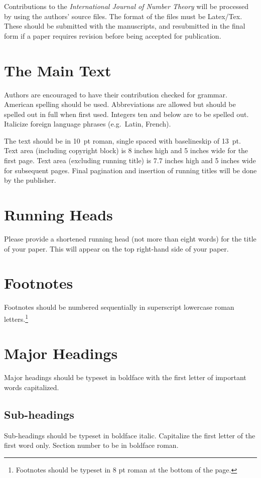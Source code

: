 \documentclass{ws-ijnt}
\begin{document}
Contributions to the {\it International Journal of Number Theory} 
will be processed by using the authors' source files. The format of 
the files must be Latex/Tex.  These should be submitted with the 
manuscripts, and resubmitted in the final form if a paper requires 
revision before being accepted for publication.

\section{The Main Text}

Authors are encouraged to have their contribution checked for grammar. 
American spelling should be used. Abbreviations are allowed but should
be spelled out in full when first used. Integers ten and below are to be
spelled out. Italicize foreign language phrases (e.g.~Latin, French).

The text should be in 10~pt roman, single spaced with  
baselineskip of 13~pt. Text area (including copyright block) 
is 8 inches high and 5 inches wide for the first page. 
Text area (excluding running title) is 7.7 inches high and 
5 inches wide for subsequent pages.  Final pagination and 
insertion of running titles will be done by the publisher.

\section{Running Heads}

Please provide a shortened running head (not more than eight words) for
the title of your paper. This will appear on the top right-hand side
of your paper.

\section{Footnotes}

Footnotes should be numbered sequentially in superscript
lowercase roman letters.\footnote{Footnotes should be
typeset in 8 pt roman at the bottom of the page.}

\section{Major Headings}
Major headings should be typeset in boldface with the first letter of
important words capitalized.

\subsection{Sub-headings}
Sub-headings should be typeset in boldface italic. Capitalize the
first letter of the first word only. Section number to be in boldface
roman.
\end{document}
